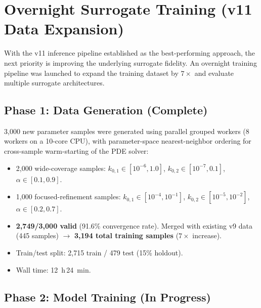 \documentclass[11pt]{article}
\begin{document}
\section{Overnight Surrogate Training (v11 Data Expansion)}

With the v11 inference pipeline established as the best-performing approach,
the next priority is improving the underlying surrogate fidelity.  An overnight
training pipeline was launched to expand the training dataset by $7\times$ and
evaluate multiple surrogate architectures.

\subsection{Phase 1: Data Generation (Complete)}

3{,}000 new parameter samples were generated using parallel grouped workers
(8 workers on a 10-core CPU), with parameter-space nearest-neighbor ordering
for cross-sample warm-starting of the PDE solver:
\begin{itemize}
  \item 2{,}000 wide-coverage samples:
        $k_{0,1} \in [10^{-6}, 1.0]$,
        $k_{0,2} \in [10^{-7}, 0.1]$,
        $\alpha \in [0.1, 0.9]$.
  \item 1{,}000 focused-refinement samples:
        $k_{0,1} \in [10^{-4}, 10^{-1}]$,
        $k_{0,2} \in [10^{-5}, 10^{-2}]$,
        $\alpha \in [0.2, 0.7]$.
  \item \textbf{2{,}749/3{,}000 valid} (91.6\% convergence rate).
        Merged with existing v9 data (445 samples) $\to$
        \textbf{3{,}194 total training samples} ($7\times$ increase).
  \item Train/test split: 2{,}715 train / 479 test (15\% holdout).
  \item Wall time: \SI{12}{h}\,\SI{24}{min}.
\end{itemize}

\subsection{Phase 2: Model Training (In Progress)}
\end{document}
